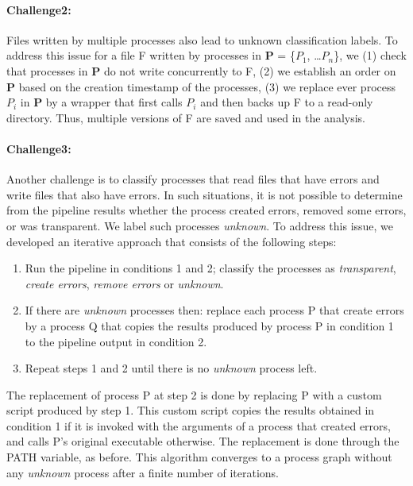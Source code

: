 \documentclass{article}
\begin{document}
{\paragraph{Challenge2:} Files written by multiple processes also lead 
to unknown classification labels. To address this issue for a file F 
written by processes in \textbf{P} = \{$P_{1}$, \ldots $P_{n}$\}, we 
(1) check that processes in \textbf{P} do not write concurrently to F, 
(2) we establish an order on \textbf{P} based on the creation timestamp 
of the processes, (3) we replace ever process $P_{i}$ in \textbf{P} by 
a wrapper that first calls $P_{i}$ and then backs up F to a read-only 
directory. Thus, multiple versions of F are saved and used in the 
analysis.

\paragraph{Challenge3:} Another challenge is to classify processes that 
read files that have errors and write files that also have errors. In 
such situations, it is not possible to determine from the pipeline 
results whether the process created errors, removed some errors, or was 
transparent. We label such processes \emph{unknown}. To address this 
issue, we developed an iterative approach that consists of the 
following steps: 

\begin{enumerate}
  \item Run the pipeline in conditions 1 and 2; classify the
    processes as \emph{transparent}, \emph{create errors},
    \emph{remove errors} or \emph{unknown}.
  \item If there are \emph{unknown} processes then: replace each process P that create errors by a process Q that
    copies the results produced by process P in condition 1 to the pipeline output in condition 2.
  \item Repeat steps 1 and 2 until there is no \emph{unknown} process left.
\end{enumerate}

The replacement of process P at step 2 is done by replacing P with a 
custom script produced by step 1. This custom script copies the results 
obtained in condition 1 if it is invoked with the arguments of a 
process that created errors, and calls P's original executable 
otherwise. The replacement is done through the PATH variable, as 
before. This algorithm converges to a process graph without any 
\emph{unknown} process after a finite number of iterations.

}
\end{document}
